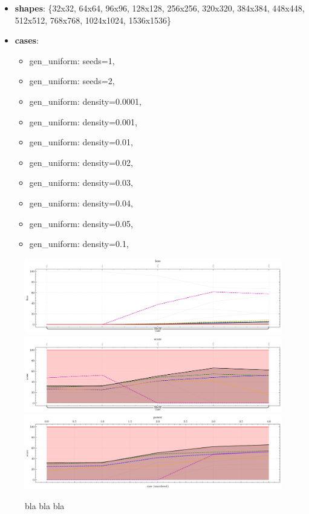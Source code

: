 \documentclass[format=acmsmall,screen,review,authordraft,nonacm]{acmart}
\begin{document}
\begin{itemize}
	\item \textbf{shapes}: \{32x32, 64x64, 96x96, 128x128, 256x256, 320x320, 384x384, 448x448, 512x512, 768x768, 1024x1024, 1536x1536\}
	\item \textbf{cases}:
        \begin{itemize}
			\item gen\_uniform: seeds=1,
			\item gen\_uniform: seeds=2,
			\item gen\_uniform: density=0.0001,
			\item gen\_uniform: density=0.001,
			\item gen\_uniform: density=0.01,
			\item gen\_uniform: density=0.02,
			\item gen\_uniform: density=0.03,
			\item gen\_uniform: density=0.04,
			\item gen\_uniform: density=0.05,
			\item gen\_uniform: density=0.1,
		\end{itemize}
\end{itemize}

\begin{figure}[H]
	\centering
	\includegraphics[width=\linewidth]{../figures/figure-2-loss}
	\includegraphics[width=\linewidth]{../figures/figure-3-score}
	\includegraphics[width=\linewidth]{../figures/figure-4-power}
	\caption{bla bla bla}
	\label{fig:abstract}
\end{figure}
\end{document}
